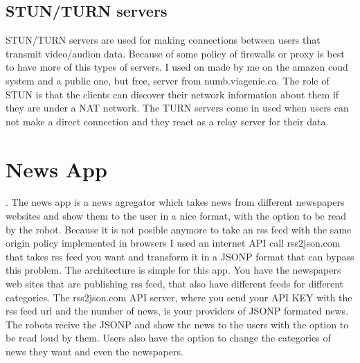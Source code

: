 \subsection{STUN/TURN servers}
\label{sub-sec:callApp-stun-turn}
STUN/TURN servers are used for making connections between users that transmit video/audion
data. Because of some policy of firewalls or proxy is best to have more of this types of servers.
I used on made by me on the amazon coud system and a public one, but free, server from numb.viagenie.ca.
The role of STUN is that the clients can discover their network information about them if they are
under a NAT network. The TURN servers come in used when users can not make a direct connection and they
react as a relay server for their data.

\section{News App}
\label{sec:newsapp}
.
The news app is a news agregator which takes news from different newspapers websites and
show them to the user in a nice format, with the option to be read by the robot. Because
it is not posible anymore to take an rss feed with the same origin policy implemented in
browsers I used an internet API call rss2json.com that takes rss feed you want and transform
it in a JSONP format that can bypass this problem. The architecture is simple for this app.
You have the newspapers web sites that are publishing rss feed, that also have different
feeds for different categories. The rss2json.com API server, where you send your API KEY
with the rss feed url and the number of news, is your providers of JSONP formated news.
The robots recive the JSONP and show the news to the users with the option to be read loud
by them. Users also have the option to change the categories of news they want and even the
newspapers.
